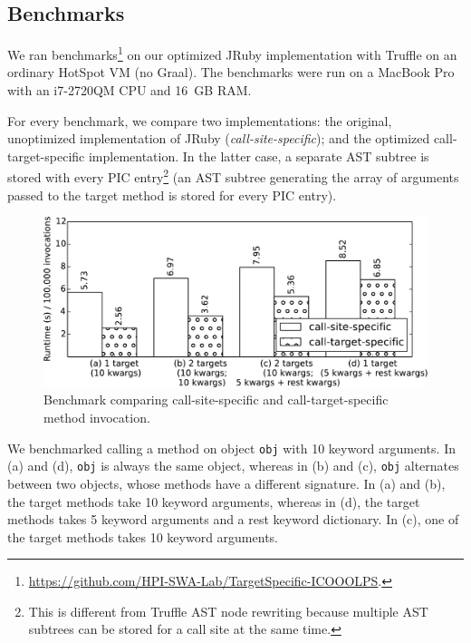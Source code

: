 \documentclass{sigplanconf} %
\begin{document}
\subsection{Benchmarks}
We ran benchmarks\footnote{\mbox{\url{https://github.com/HPI-SWA-Lab/TargetSpecific-ICOOOLPS}}.} on our optimized JRuby implementation with Truffle on an ordinary HotSpot VM (no Graal). The benchmarks were run on a MacBook Pro with an i7-2720QM CPU and 16~GB RAM.

For every benchmark, we compare two implementations: the original, unoptimized implementation of JRuby (\emph{call-site-specific}); and the optimized call-target-specific implementation. In the latter case, a separate AST subtree is stored with every PIC entry\footnote{This is different from Truffle AST node rewriting because multiple AST subtrees can be stored for a call site at the same time.} (an AST subtree generating the array of arguments passed to the target method is stored for every PIC entry).

\begin{figure}
\includegraphics[width=\linewidth]{resources/benchmark}
\caption{Benchmark comparing call-site-specific and call-target-specific method invocation.}
\label{fig:benchmark}
\end{figure}

We benchmarked calling a method on object \lstinline{obj} with 10 keyword arguments. In (a) and (d), \lstinline{obj} is always the same object, whereas in (b) and (c), \lstinline{obj} alternates between two objects, whose methods have a different signature. In (a) and (b), the target methods take 10 keyword arguments, whereas in (d), the target methods takes 5 keyword arguments and a rest keyword dictionary. In (c), one of the target methods takes 10 keyword arguments.
\end{document}
